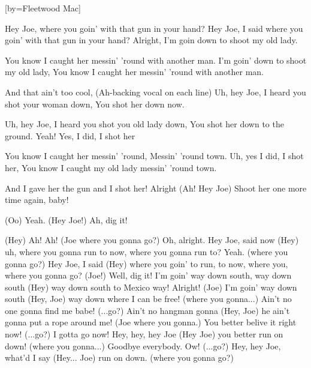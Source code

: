 

[by=Fleetwood Mac]

\begin{LARGE}


\beginverse
Hey Joe, where you goin' with that gun in your hand?
Hey Joe, I said where you goin' with that gun in your hand?
Alright, I'm goin down to shoot my old lady.

You know I caught her messin' 'round with another man.
I'm goin' down to shoot my old lady, You know I caught her messin' 'round with another man.

And that ain't too cool,
(Ah-backing vocal on each line)
Uh, hey Joe, I heard you shot your woman down, You shot her down now.
\endverse

\beginverse
Uh, hey Joe, I heard you shot you old lady down, You shot her down to the ground. Yeah!
Yes, I did, I shot her

You know I caught her messin' 'round, Messin' 'round town.
Uh, yes I did, I shot her, You know I caught my old lady messin' 'round town.

And I gave her the gun and I shot her! Alright
(Ah! Hey Joe)
Shoot her one more time again, baby!

(Oo) Yeah.
(Hey Joe!) Ah, dig it!
\endverse

\beginchorus
(Hey) Ah! Ah! (Joe where you gonna go?)
Oh, alright. Hey Joe, said now (Hey)
uh, where you gonna run to now, where you gonna run to? Yeah.
(where you gonna go?)
Hey Joe, I said (Hey)
where you goin' to run, to now, where you, where you gonna go? (Joe!)
Well, dig it! I'm goin' way down south, way down south (Hey)
way down south to Mexico way! Alright! (Joe)
I'm goin' way down south (Hey, Joe)
way down where I can be free! (where you gonna...)
Ain't no one gonna find me babe! (...go?)
Ain't no hangman gonna (Hey, Joe)
he ain't gonna put a rope around me! (Joe where you gonna.)
You better belive it right now! (...go?)
I gotta go now! Hey, hey, hey Joe (Hey Joe)
you better run on down! (where you gonna...)
Goodbye everybody. Ow! (...go?)
Hey, hey Joe, what'd I say (Hey... Joe)
run on down. (where you gonna go?)
\endchorus

\end{LARGE}


\chordson
\endsong
